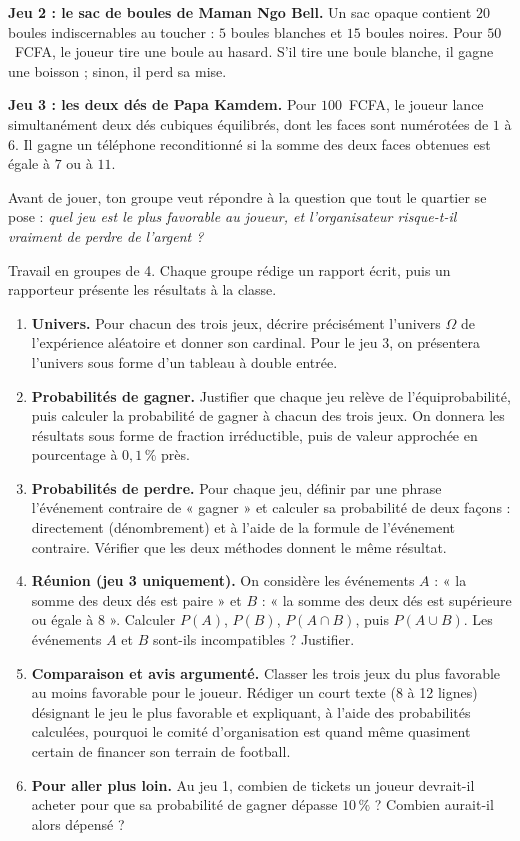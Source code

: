 \documentclass[11pt]{article}
\newcounter{popsec}
\newcounter{popsub}
\newcommand{\courssub}[1]{%
  \stepcounter{popsub}%
  \par\vspace{9pt}\noindent{\popxbold\fontsize{11.5}{13}\selectfont\color{popink}{\color{poporange}\thepopsec.\thepopsub}\hspace{6pt}#1}\par\nopagebreak\vspace{4pt}
}
\begin{document}
\textbf{Jeu 2 : le sac de boules de Maman Ngo Bell.} Un sac opaque contient $20$ boules indiscernables au toucher : $5$ boules blanches et $15$ boules noires. Pour $50$~FCFA, le joueur tire une boule au hasard. S'il tire une boule blanche, il gagne une boisson ; sinon, il perd sa mise.

\textbf{Jeu 3 : les deux dés de Papa Kamdem.} Pour $100$~FCFA, le joueur lance simultanément deux dés cubiques équilibrés, dont les faces sont numérotées de $1$ à $6$. Il gagne un téléphone reconditionné si la somme des deux faces obtenues est égale à $7$ ou à $11$.

Avant de jouer, ton groupe veut répondre à la question que tout le quartier se pose : \emph{quel jeu est le plus favorable au joueur, et l'organisateur risque-t-il vraiment de perdre de l'argent ?}

\courssub{Consignes}

Travail en groupes de 4. Chaque groupe rédige un rapport écrit, puis un rapporteur présente les résultats à la classe.

\begin{enumerate}
\item \textbf{Univers.} Pour chacun des trois jeux, décrire précisément l'univers $\Omega$ de l'expérience aléatoire et donner son cardinal. Pour le jeu 3, on présentera l'univers sous forme d'un tableau à double entrée.
\item \textbf{Probabilités de gagner.} Justifier que chaque jeu relève de l'équiprobabilité, puis calculer la probabilité de gagner à chacun des trois jeux. On donnera les résultats sous forme de fraction irréductible, puis de valeur approchée en pourcentage à $0,1\,\%$ près.
\item \textbf{Probabilités de perdre.} Pour chaque jeu, définir par une phrase l'événement contraire de « gagner » et calculer sa probabilité de deux façons : directement (dénombrement) et à l'aide de la formule de l'événement contraire. Vérifier que les deux méthodes donnent le même résultat.
\item \textbf{Réunion (jeu 3 uniquement).} On considère les événements $A$ : « la somme des deux dés est paire » et $B$ : « la somme des deux dés est supérieure ou égale à $8$ ». Calculer $P(A)$, $P(B)$, $P(A\cap B)$, puis $P(A\cup B)$. Les événements $A$ et $B$ sont-ils incompatibles ? Justifier.
\item \textbf{Comparaison et avis argumenté.} Classer les trois jeux du plus favorable au moins favorable pour le joueur. Rédiger un court texte (8 à 12 lignes) désignant le jeu le plus favorable et expliquant, à l'aide des probabilités calculées, pourquoi le comité d'organisation est quand même quasiment certain de financer son terrain de football.
\item \textbf{Pour aller plus loin.} Au jeu 1, combien de tickets un joueur devrait-il acheter pour que sa probabilité de gagner dépasse $10\,\%$ ? Combien aurait-il alors dépensé ?
\end{enumerate}
\end{document}
